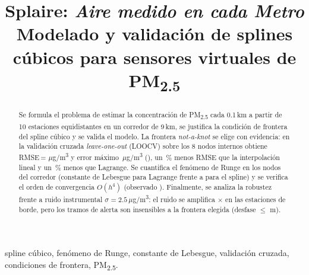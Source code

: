 \documentclass[conference,a4paper]{IEEEtran}
\newcommand{\ugm}{\ensuremath{\mu}g/m\textsuperscript{3}}
\newcommand{\PMdc}{PM\textsubscript{2.5}}
\newcommand{\nak}{\emph{not-a-knot}}
\begin{document}
\title{Splaire: \emph{Aire medido en cada Metro}\\[2pt]
{\Large Modelado y validación de splines cúbicos para sensores virtuales de \PMdc}}

\author{
}

\maketitle

\begin{abstract}
Se formula el problema de estimar la concentración de \PMdc{} cada 0.1\,km a partir de 10 estaciones
equidistantes en un corredor de 9\,km, se justifica la condición de frontera del spline cúbico y se valida
el modelo. La frontera \nak{} se elige con evidencia: en la validación cruzada \emph{leave-one-out} (LOOCV)
sobre los 8 nodos internos obtiene RMSE\,=\,\RMSEnak{}\,\ugm{} y error máximo \EMAXnak{}\,\ugm{}
(\PEORnak), un \REDlin\,\% menos RMSE que la interpolación lineal y un \REDlag\,\% menos que Lagrange.
Se cuantifica el fenómeno de Runge en los nodos del corredor (constante de Lebesgue \LEBlag{} para Lagrange
frente a \LEBnak{} para el spline) y se verifica el orden de convergencia $O(h^4)$ (observado \ORDnak).
Finalmente, se analiza la robustez frente a ruido instrumental $\sigma=2.5$\,\ugm: el ruido se amplifica
$\times$\FACnakBorde{} en las estaciones de borde, pero los tramos de alerta son insensibles a la frontera
elegida (desfase $\le$\,\DESFASEsplines\,m).
\end{abstract}

\begin{IEEEkeywords}
spline cúbico, fenómeno de Runge, constante de Lebesgue, validación cruzada, condiciones de frontera, \PMdc.
\end{IEEEkeywords}

\end{document}
